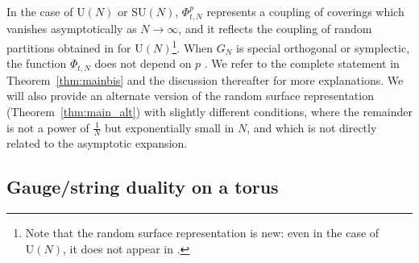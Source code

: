 \documentclass[11pt,a4paper,reqno]{article}
\theoremstyle{definition}
\theoremstyle{remark}
\newcommand\SU{{\mathrm{SU}}}
\newcommand\U{{\mathrm U}}
\begin{document}
In the case of $\U(N)$ or $\SU(N)$, $\Phi_{t,N}^{p}$ represents a coupling of coverings which vanishes asymptotically as $N\to\infty$, and it reflects the coupling of random partitions obtained in \cite{LM2} for $\U(N)$\footnote{Note that the random surface representation is new: even in the case of $\U(N)$, it does not appear in \cite{LM2}.}. When $G_N$ is special orthogonal or symplectic, the function $\Phi_{t,N}$ does not depend on $p$ . We refer to the complete statement in Theorem~\ref{thm:mainbis} and the discussion thereafter for more explanations. We will also provide an alternate version of the random surface representation (Theorem~\ref{thm:main_alt}) with slightly different conditions, where the remainder is not a power of $\frac1N$ but exponentially small in $N$, and which is not directly related to the asymptotic expansion.

\subsection{Gauge/string duality on a torus}
\end{document}
